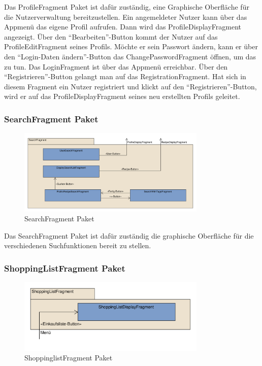 Das ProfileFragment Paket ist dafür zuständig, eine Graphische Oberfläche für die Nutzerverwaltung bereitzustellen. 
Ein angemeldeter Nutzer kann über das Appmenü das eigene Profil aufrufen. Dann wird das ProfileDisplayFragment angezeigt. Über den "`Bearbeiten"'-Button kommt der Nutzer auf das ProfileEditFragment seines Profils. Möchte er sein Passwort ändern, kann er über den "`Login-Daten ändern"'-Button das ChangePasswordFragment öffnen, um das zu tun.
Das LoginFragment ist über das Appmenü erreichbar. Über den "`Registrieren"'-Button gelangt man auf das RegistrationFragment. Hat sich in diesem Fragment ein Nutzer registriert und klickt auf den "`Registrieren"'-Button, wird er auf das ProfileDisplayFragment seines neu erstellten Profils geleitet.


\subsubsection{SearchFragment Paket}
\begin{figure}[H]
	\centering
	\includegraphics[width=0.8\textwidth]{pics/viewPackages/SearchFragmentPaket.pdf}%
	\caption{SearchFragment Paket}%
	\label{view}%
\end{figure}
Das SearchFragment Paket ist dafür zuständig die 
graphische Oberfläche für die verschiedenen Suchfunktionen
bereit zu stellen. 

\subsubsection{ShoppingListFragment Paket}
\begin{figure}[H]
	\centering
	\includegraphics[width=0.8\textwidth]{pics/viewPackages/ShoppinglistFragmentPaket.pdf}%
	\caption{ShoppinglistFragment Paket}%
	\label{view}%
\end{figure}

